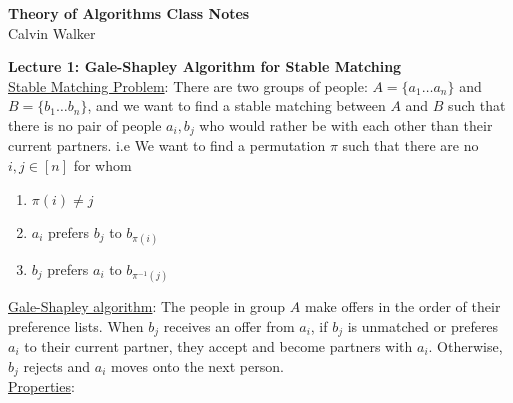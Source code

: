 \documentclass{article}
\begin{document}
\begin{center}
    \textbf{Theory of Algorithms Class Notes} \\[0.25ex]
    Calvin Walker
\end{center}

\textbf{Lecture 1: Gale-Shapley Algorithm for Stable Matching} \\[1.0ex]
\underline{Stable Matching Problem}: There are two groups of people: $A = \{a_1 \dots a_n\}$ and $B = \{b_1 \dots b_n\}$, and we want to find a stable matching between $A$ and $B$ such that there is no pair of people $a_i, b_j$ who would rather be with each other than their current partners. i.e We want to find a permutation $\pi$ such that there are no $i, j \in [n]$ for whom
\begin{enumerate}
    \item $\pi(i) \neq j$
    \item $a_i$ prefers $b_j$ to $b_{\pi(i)}$
    \item $b_j$ prefers $a_i$ to $b_{\pi^{-1}(j)}$
\end{enumerate}
\underline{Gale-Shapley algorithm}: The people in group $A$ make offers in the order of their preference lists. When $b_j$ receives an offer from $a_i$, if $b_j$ is unmatched or preferes $a_i$ to their current partner, they accept and become partners with $a_i$. Otherwise, $b_j$ rejects and $a_i$ moves onto the next person. \\[0.5ex]
\underline{Properties}:
\end{document}
